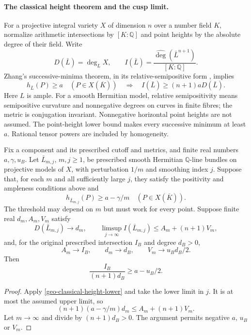 \paragraph{The classical height theorem and the cusp limit.}
For a projective integral variety $X$ of dimension $n$ over a number
field $K$, normalize arithmetic intersections by $[K:\mathbb Q]$ and
point heights by the absolute degree of their field. Write
\[
 D(\bar L)=\deg_LX,\qquad
 I(\bar L)=\frac{\widehat{\deg}(\bar L^{n+1})}{[K:\mathbb Q]}.
\]
Zhang's successive-minima theorem, in its relative-semipositive form
\cite[Theorems A.4.2 and A.5.2]{yuan-zhang-adelic}, implies
\begin{equation}\label{geo-classical-height-lower}
 h_{\bar L}(P)\ge a\quad(P\in X(\overline K))
 \quad\Longrightarrow\quad
 I(\bar L)\ge(n+1)aD(\bar L).
\end{equation}
Here $L$ is ample. For a smooth Hermitian model, relative semipositivity
means semipositive curvature and nonnegative degrees on curves in
finite fibres; the metric is conjugation invariant. Nonnegative
horizontal point heights are not assumed. The point-height lower
bound makes every successive minimum at least $a$. Rational tensor
powers are included by homogeneity.

\begin{proposition}
\label{geo-reciprocal-height-limit}
Fix a component and its prescribed cutoff and metrics, and finite
real numbers $a,\gamma,u_B$.
Let $\bar L_{m,j}$, $m,j\ge1$, be prescribed smooth Hermitian
$\mathbb Q$-line bundles on projective models of $X$, with perturbation
$1/m$ and smoothing index $j$. Suppose that, for each $m$ and all
sufficiently large $j$, they satisfy the positivity and ampleness
conditions above and
\[
             h_{\bar L_{m,j}}(P)\ge a-\gamma/m
                         \quad(P\in X(\overline K)).
\]
The threshold may depend on $m$ but must work for every point.
Suppose finite real $d_m,A_m,V_m$ satisfy
\[
 D(\bar L_{m,j})\longrightarrow d_m,\qquad
 \limsup_{j\to\infty}I(\bar L_{m,j})\le A_m+(n+1)V_m,
\]
and, for the original prescribed intersection $I_B$ and degree $d_B>0$,
\[
 A_m\longrightarrow I_B,\qquad d_m\longrightarrow d_B,\qquad
 V_m\longrightarrow u_Bd_B/2.
\]
Then
\[
                   \frac{I_B}{(n+1)d_B}\ge a-u_B/2.
\]
\end{proposition}

\begin{proof}
Apply \eqref{geo-classical-height-lower} and take the lower limit in
$j$. It is at most the assumed upper limit, so
\[
 (n+1)(a-\gamma/m)d_m\le A_m+(n+1)V_m.
\]
Let $m\to\infty$ and divide by $(n+1)d_B>0$. The argument permits
negative $a$, $u_B$ or $V_m$.
\end{proof}

